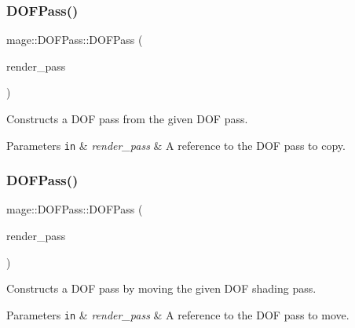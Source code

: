 \subsubsection{\texorpdfstring{D\+O\+F\+Pass()}{DOFPass()}\hspace{0.1cm}{\footnotesize\ttfamily [2/3]}}
{\footnotesize\ttfamily mage\+::\+D\+O\+F\+Pass\+::\+D\+O\+F\+Pass (\begin{DoxyParamCaption}\item[{const \hyperlink{classmage_1_1_d_o_f_pass}{D\+O\+F\+Pass} \&}]{render\+\_\+pass }\end{DoxyParamCaption})\hspace{0.3cm}{\ttfamily [delete]}}

Constructs a D\+OF pass from the given D\+OF pass.


\begin{DoxyParams}[1]{Parameters}
\mbox{\tt in}  & {\em render\+\_\+pass} & A reference to the D\+OF pass to copy. \\
\hline
\end{DoxyParams}
\hypertarget{classmage_1_1_d_o_f_pass_aa591f5cac76b37e4d0f765143385bdea}{}\label{classmage_1_1_d_o_f_pass_aa591f5cac76b37e4d0f765143385bdea} 
\subsubsection{\texorpdfstring{D\+O\+F\+Pass()}{DOFPass()}\hspace{0.1cm}{\footnotesize\ttfamily [3/3]}}
{\footnotesize\ttfamily mage\+::\+D\+O\+F\+Pass\+::\+D\+O\+F\+Pass (\begin{DoxyParamCaption}\item[{\hyperlink{classmage_1_1_d_o_f_pass}{D\+O\+F\+Pass} \&\&}]{render\+\_\+pass }\end{DoxyParamCaption})\hspace{0.3cm}{\ttfamily [default]}}

Constructs a D\+OF pass by moving the given D\+OF shading pass.


\begin{DoxyParams}[1]{Parameters}
\mbox{\tt in}  & {\em render\+\_\+pass} & A reference to the D\+OF pass to move. \\
\hline
\end{DoxyParams}
\hypertarget{classmage_1_1_d_o_f_pass_a2a46bc7b2579f1d67fd412c89386d2f4}{}\label{classmage_1_1_d_o_f_pass_a2a46bc7b2579f1d67fd412c89386d2f4} 
